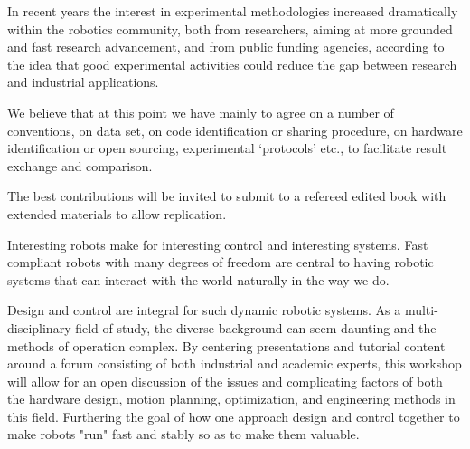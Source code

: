\begin{spacing}{1.0}
{In recent years the interest in experimental methodologies increased dramatically within the robotics community, both from researchers, aiming at more grounded and fast research advancement, and from public funding agencies, according to the idea that good experimental activities could reduce the gap between research and industrial applications.

We believe that at this point we have mainly to agree on a number of conventions, on data set, on code identification or sharing procedure, on hardware identification or open sourcing, experimental ‘protocols’ etc.,   to facilitate result exchange and comparison.

The best contributions will be invited to submit to a refereed edited book with extended materials to allow replication.
}



{
Interesting robots make for interesting control and interesting systems. Fast compliant robots with many degrees of freedom are central to having robotic systems that can interact with the world naturally in the way we do.

Design and control are integral for such dynamic robotic systems. As a multi-disciplinary field of study, the diverse background can seem daunting and the methods of operation complex. By centering presentations and tutorial content around a forum consisting of both industrial and academic experts, this workshop will allow for an open discussion of the issues and complicating factors of both the hardware design, motion planning, optimization, and engineering methods in this field. Furthering the goal of how one approach design and control together to make robots "run" fast and stably so as to make them valuable. 
}




\end{spacing}
